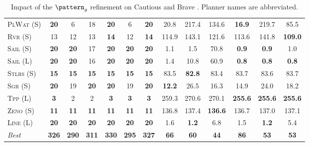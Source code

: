 \begin{table}[tb]
{\begin{tabular}{|l||cccccc||cccccc||}
\textsc{PlWat} (S)&\textbf{20}&6&18&\textbf{20}&6&\textbf{20}&20.8&217.4&134.6&\textbf{16.9}&219.7&85.5\\
\textsc{Rvr} (S)&13&12&13&\textbf{14}&12&\textbf{14}&114.9&143.1&121.6&113.6&141.8&\textbf{109.0}\\
\textsc{Sail} (S)&\textbf{20}&\textbf{20}&17&\textbf{20}&\textbf{20}&\textbf{20}&1.1&1.5&70.8&\textbf{0.9}&\textbf{0.9}&1.0\\
\textsc{Sail} (L)&\textbf{20}&\textbf{20}&16&\textbf{20}&\textbf{20}&\textbf{20}&1.4&10.8&60.9&\textbf{0.8}&\textbf{0.8}&\textbf{0.8}\\
\textsc{Stlrs} (S)&\textbf{15}&\textbf{15}&\textbf{15}&\textbf{15}&\textbf{15}&\textbf{15}&83.5&\textbf{82.8}&83.4&83.7&83.6&83.7\\
\textsc{Sgr} (S)&\textbf{20}&19&\textbf{20}&\textbf{20}&19&\textbf{20}&\textbf{12.2}&26.5&16.3&14.9&24.0&18.2\\
\textsc{Tpp} (L)&\textbf{3}&2&2&\textbf{3}&\textbf{3}&\textbf{3}&259.3&270.6&270.1&\textbf{255.6}&\textbf{255.6}&\textbf{255.6}\\
\textsc{Zeno} (S)&\textbf{11}&\textbf{11}&\textbf{11}&\textbf{11}&\textbf{11}&\textbf{11}&136.8&137.4&\textbf{136.6}&136.7&137.0&137.1\\
\textsc{Line} (L)&\textbf{20}&\textbf{20}&\textbf{20}&\textbf{20}&\textbf{20}&\textbf{20}&1.6&\textbf{1.2}&6.8&1.5&\textbf{1.2}&5.4
\\\hline
\textit{Best}&\textbf{326}&\textbf{290}&\textbf{311}&\textbf{330}&\textbf{295}&\textbf{327}&\textbf{66}&\textbf{60}&\textbf{44}&\textbf{86}&\textbf{53}&\textbf{53}\\\hline

        \end{tabular}}
        \caption{Impact of the $\pattern_g$ refinement on Cautious and Brave \pattyd. Planner names are abbreviated.}
        \label{tab:abl-patterng}
        \end{table}
        